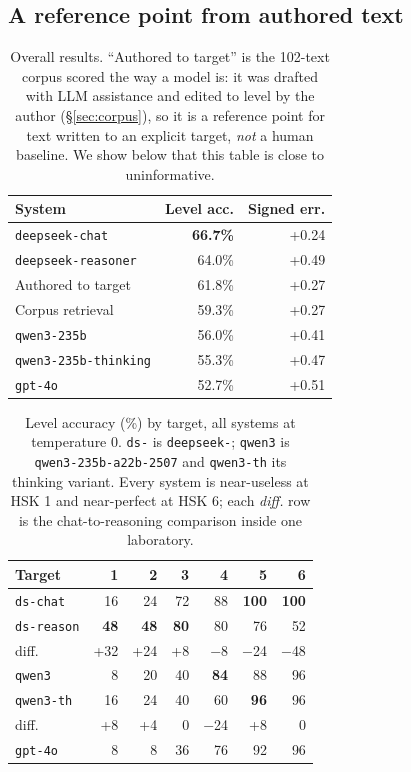 \documentclass[11pt]{article}
\begin{document}
\subsection{A reference point from authored text}

\begin{table}[t]
\centering\small
\begin{tabular}{@{}lrr@{}}
\toprule
\textbf{System} & \textbf{Level acc.} & \textbf{Signed err.} \\
\midrule
\texttt{deepseek-chat} & \textbf{66.7\%} & +0.24 \\
\texttt{deepseek-reasoner} & 64.0\% & +0.49 \\
Authored to target & 61.8\% & +0.27 \\
Corpus retrieval & 59.3\% & +0.27 \\
\texttt{qwen3-235b} & 56.0\% & +0.41 \\
\texttt{qwen3-235b-thinking} & 55.3\% & +0.47 \\
\texttt{gpt-4o} & 52.7\% & +0.51 \\
\bottomrule
\end{tabular}
\caption{Overall results. ``Authored to target'' is the 102-text corpus scored
the way a model is: it was drafted with LLM assistance and edited to level by the
author (\S\ref{sec:corpus}), so it is a reference point for text written to an
explicit target, \emph{not} a human baseline. We show below that this table is
close to uninformative.}
\label{tab:bench}
\end{table}

\begin{table}[t]
\centering\small
\begin{tabular}{@{}lrrrrrr@{}}
\toprule
\textbf{Target} & 1 & 2 & 3 & 4 & 5 & 6 \\
\midrule
\texttt{ds-chat}    & 16 & 24 & 72 & 88 & \textbf{100} & \textbf{100} \\
\texttt{ds-reason}  & \textbf{48} & \textbf{48} & \textbf{80} & 80 & 76 & 52 \\
\quad diff.         & +32 & +24 & +8 & $-$8 & $-$24 & $-$48 \\
\addlinespace
\texttt{qwen3}      & 8 & 20 & 40 & \textbf{84} & 88 & 96 \\
\texttt{qwen3-th}   & 16 & 24 & 40 & 60 & \textbf{96} & 96 \\
\quad diff.         & +8 & +4 & 0 & $-$24 & +8 & 0 \\
\addlinespace
\texttt{gpt-4o}     & 8 & 8 & 36 & 76 & 92 & 96 \\
\bottomrule
\end{tabular}
\caption{Level accuracy (\%) by target, all systems at temperature 0.
\texttt{ds-} is \texttt{deepseek-}; \texttt{qwen3} is
\texttt{qwen3-235b-a22b-2507} and \texttt{qwen3-th} its thinking variant.
Every system is near-useless at HSK 1 and near-perfect at HSK 6; each
\emph{diff.} row is the chat-to-reasoning comparison inside one laboratory.}
\label{tab:perlevel}
\end{table}
\end{document}
